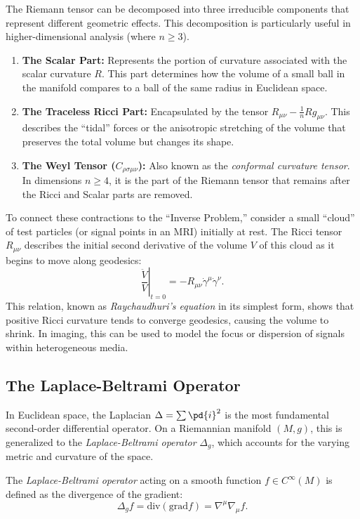 The Riemann tensor can be decomposed into three irreducible components that represent different geometric effects. This decomposition is particularly useful in higher-dimensional analysis (where $n \geq 3$).
\begin{enumerate}
  \item \textbf{The Scalar Part:} Represents the portion of curvature associated with the scalar curvature $R$. This part determines how the volume of a small ball in the manifold compares to a ball of the same radius in Euclidean space.

  \item \textbf{The Traceless Ricci Part:} Encapsulated by the tensor $R_{\mu\nu} - \frac{1}{n} R g_{\mu\nu}$. This describes the ``tidal'' forces or the anisotropic stretching of the volume that preserves the total volume but changes its shape.

  \item \textbf{The Weyl Tensor ($C_{\rho\sigma\mu\nu}$):} Also known as the \emph{conformal curvature tensor}. In dimensions $n \geq 4$, it is the part of the Riemann tensor that remains after the Ricci and Scalar parts are removed.
\end{enumerate}

To connect these contractions to the ``Inverse Problem,'' consider a small ``cloud'' of test particles (or signal points in an MRI) initially at rest. The Ricci tensor $R_{\mu\nu}$ describes the initial second derivative of the volume $V$ of this cloud as it begins to move along geodesics:
\begin{equation}
  \left. \frac{\ddot{V}}{V} \right\rvert_{t=0} = -R_{\mu\nu} \dot{\gamma}^\mu \dot{\gamma}^\nu
.\end{equation}
This relation, known as \emph{Raychaudhuri's equation} in its simplest form, shows that positive Ricci curvature tends to converge geodesics, causing the volume to shrink. In imaging, this can be used to model the focus or dispersion of signals within heterogeneous media.

\subsection{The Laplace-Beltrami Operator}

In Euclidean space, the Laplacian $\Delta = \sum \pd{i}^2$ is the most fundamental second-order differential operator. On a Riemannian manifold $(M, g)$, this is generalized to the \emph{Laplace-Beltrami operator} $\Delta_g$, which accounts for the varying metric and curvature of the space.
\begin{definition}
  The \emph{Laplace-Beltrami operator} acting on a smooth function $f \in C^\infty(M)$ is defined as the divergence of the gradient:
  \begin{equation}
    \Delta_g f = \text{div}(\text{grad} f) = \nabla^\mu \nabla_\mu f
  .\end{equation}
\end{definition}

